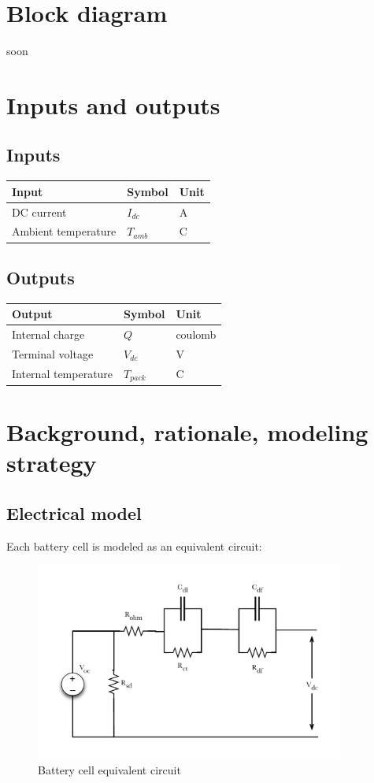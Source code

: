 \documentclass{article}
\begin{document}
\section{Block diagram}
soon

\section{Inputs and outputs}
	\subsection{Inputs}
	\begin{tabular}{ l | l | l  }
		Input					&	Symbol		&	Unit		\\	\hline
		DC current			&	$I_{dc}$		&	A		\\
		Ambient temperature	&	$T_{amb}$	&	\degree C \\ 
	\end{tabular}
	
	\subsection{Outputs}
	\begin{tabular}{ l | l | l  }
		Output					&	Symbol		&	Unit		\\	\hline
		Internal charge				&	$Q$			&	coulomb	\\
		Terminal voltage			&	$V_{dc}$		&	V		\\
		Internal temperature			&	$T_{pack}$	&	\degree C	\\
	\end{tabular}
	
\section{Background, rationale, modeling strategy}
	\subsection{Electrical model}
		Each battery cell is modeled as an equivalent circuit:
		
		\begin{figure}[h!]
				\centering
				\includegraphics[width=4in]{Figures/Battery_pack_equivalent_circuit}
				\caption{Battery cell equivalent circuit}
				\label{fig:battery_pack_equivalent_circuit}
		\end{figure}
		\FloatBarrier
		
\end{document}
